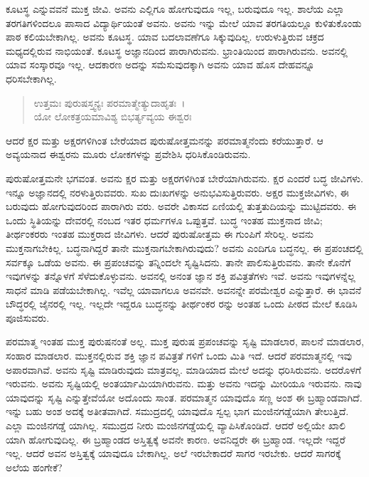 ಕೂಟಸ್ಥ ಎನ್ನುವವನೆ ಮುಕ್ತ ಜೀವಿ. ಅವನು ಎಲ್ಲಿಗೂ ಹೋಗುವುದೂ ಇಲ್ಲ, ಬರುವುದೂ ಇಲ್ಲ. ಶಾಲೆಯ ಎಲ್ಲಾ ತರಗತಿಗಳಿಂದಲೂ ಪಾಸಾದ ವಿದ್ಯಾರ್ಥಿಯಂತೆ ಅವನು. ಅವನು ಇನ್ನು ಮೇಲೆ ಯಾವ ತರಗತಿಯಲ್ಲೂ ಕುಳಿತುಕೊಂಡು ಪಾಠ ಕಲಿಯಬೇಕಾಗಿಲ್ಲ. ಅವನು ಕೂಟಸ್ಥ. ಯಾವ ಬದಲಾವಣೆಗೂ ಸಿಕ್ಕುವುದಿಲ್ಲ. ಉರುಳುತ್ತಿರುವ ಚಕ್ರದ ಮಧ್ಯದಲ್ಲಿರುವ ನಾಭಿಯಂತೆ. ಕೂಟಸ್ಥ ಅಜ್ಞಾನದಿಂದ ಪಾರಾಗಿರುವನು. ಭ್ರಾಂತಿಯಿಂದ ಪಾರಾಗಿರುವನು. ಅವನಲ್ಲಿ ಯಾವ ಸಂಸ್ಕಾರವೂ ಇಲ್ಲ. ಆದಕಾರಣ ಅದನ್ನು ಸಮೆಸುವುದಕ್ಕಾಗಿ ಅವನು ಯಾವ ಹೊಸ ದೇಹವನ್ನೂ ಧರಿಸಬೇಕಾಗಿಲ್ಲ.

\begin{verse}
ಉತ್ತಮಃ ಪುರುಷಸ್ತ್ವನ್ಯಃ ಪರಮಾತ್ಮೇತ್ಯುದಾಹೃತಃ~।\\ಯೋ ಲೋಕತ್ರಯಮಾವಿಶ್ಯ ಬಿಭರ್ತ್ಯವ್ಯಯ ಈಶ್ವರಃ 
\end{verse}

{\small ಆದರೆ ಕ್ಷರ ಮತ್ತು ಅಕ್ಷರಗಳಿಗಿಂತ ಬೇರೆಯಾದ ಪುರುಷೋತ್ತಮನನ್ನು ಪರಮಾತ್ಮನೆಂದು ಕರೆಯುತ್ತಾರೆ. ಆ ಅವ್ಯಯನಾದ ಈಶ್ವರನು ಮೂರು ಲೋಕಗಳನ್ನು ಪ್ರವೇಶಿಸಿ ಧರಿಸಿಕೊಂಡಿರುವನು.}

ಪುರುಷೋತ್ತಮನೇ ಭಗವಂತ. ಅವನು ಕ್ಷರ ಮತ್ತು ಅಕ್ಷರಗಳಿಗಿಂತ ಬೇರೆಯಾಗಿರುವನು. ಕ್ಷರ ಎಂದರೆ ಬದ್ಧ ಜೀವಿಗಳು. ಇನ್ನೂ ಅಜ್ಞಾನದಲ್ಲಿ ನರಳುತ್ತಿರುವವರು. ಸುಖ ದುಃಖಗಳನ್ನು ಅನುಭವಿಸುತ್ತಿರುವರು. ಅಕ್ಷರ ಮುಕ್ತಜೀವಿಗಳು, ಈ ಬರುವುದು ಹೋಗುವುದರಿಂದ ಪಾರಾಗಿರು ವರು. ಅವರೇ ವಿಕಾಸದ ಏಣಿಯಲ್ಲಿ ತುತ್ತತುದಿಯನ್ನು ಮುಟ್ಟಿದವರು. ಈ ಒಂದು ಸ್ಥಿತಿಯನ್ನು ದೇವರಲ್ಲಿ ನಂಬದ ಇತರ ಧರ್ಮಗಳೂ ಒಪ್ಪುತ್ತವೆ. ಬುದ್ಧ ಇಂತಹ ಮುಕ್ತನಾದ ಜೀವಿ; ತೀರ್ಥಂಕರರು ಇಂತಹ ಮುಕ್ತರಾದ ಜೀವಿಗಳು. ಆದರೆ ಪುರುಷೋತ್ತಮ ಈ ಗುಂಪಿಗೆ ಸೇರಿಲ್ಲ. ಅವನು ಮುಕ್ತನಾಗಬೇಕಿಲ್ಲ. ಬದ್ಧನಾಗಿದ್ದರೆ ತಾನೇ ಮುಕ್ತನಾಗಬೇಕಾಗಿರುವುದು? ಅವನು ಎಂದಿಗೂ ಬದ್ಧನಲ್ಲ. ಈ ಪ್ರಪಂಚದಲ್ಲಿ ಸರ್ವಕ್ಕೂ ಒಡೆಯ ಅವನು. ಈ ಪ್ರಪಂಚವನ್ನು ತನ್ನಿಂದಲೇ ಸೃಷ್ಟಿಸಿದನು. ತಾನೇ ಪಾಲಿಸುತ್ತಿರುವನು. ತಾನೇ ಕೊನೆಗೆ ಇವುಗಳನ್ನು ತನ್ನೊಳಗೆ ಸೆಳೆದುಕೊಳ್ಳುವನು. ಅವನಲ್ಲಿ ಅನಂತ ಜ್ಞಾನ ಶಕ್ತಿ ಪವಿತ್ರತೆಗಳು ಇವೆ. ಅವನು ಇವುಗಳನ್ನೆಲ್ಲ ಸಾಧನೆ ಮಾಡಿ ಪಡೆಯಬೇಕಾಗಿಲ್ಲ. ಇವೆಲ್ಲ ಯಾವಾಗಲೂ ಅವನವೇ. ಅವನನ್ನೇ ಪರಮೇಶ್ವರ ಎನ್ನುತ್ತಾರೆ. ಈ ಭಾವನೆ ಬೌದ್ಧರಲ್ಲಿ ಜೈನರಲ್ಲಿ ಇಲ್ಲ. ಇಲ್ಲದೇ ಇದ್ದರೂ ಬುದ್ಧನನ್ನು ತೀರ್ಥಂಕರ ರನ್ನು ಅಂತಹ ಒಂದು ಪೀಠದ ಮೇಲೆ ಕೂಡಿಸಿ ಪೂಜಿಸುವರು.

ಪರಮಾತ್ಮ ಇಂತಹ ಮುಕ್ತ ಪುರುಷನಂತೆ ಅಲ್ಲ. ಮುಕ್ತ ಪುರುಷ ಪ್ರಪಂಚವನ್ನು ಸೃಷ್ಟಿ ಮಾಡಲಾರ, ಪಾಲನೆ ಮಾಡಲಾರ, ಸಂಹಾರ ಮಾಡಲಾರ. ಮುಕ್ತನಲ್ಲಿರುವ ಶಕ್ತಿ ಜ್ಞಾನ ಪವಿತ್ರತೆ ಗಳಿಗೆ ಒಂದು ಮಿತಿ ಇದೆ. ಆದರೆ ಪರಮಾತ್ಮನಲ್ಲಿ ಇವು ಅಪಾರವಾಗಿವೆ. ಅವನು ಸೃಷ್ಟಿ ಮಾಡಿರುವುದು ಮಾತ್ರವಲ್ಲ. ಮಾಡಿಯಾದ ಮೇಲೆ ಅದನ್ನು ಧರಿಸಿರುವನು. ಅದರೊಳಗೆ ಇರುವನು. ಅವನು ಸೃಷ್ಟಿಯಲ್ಲಿ ಅಂತರ್ಯಾಮಿಯಾಗಿರುವನು. ಮತ್ತು ಅವನು ಇದನ್ನು ಮೀರಿಯೂ ಇರುವನು. ನಾವು ಯಾವುದನ್ನು ಸೃಷ್ಟಿ ಎನ್ನುತ್ತೇವೆಯೋ ಅದೊಂದು ಸಾಂತ. ಪರಮಾತ್ಮನ ಯಾವುದೊ ಸಣ್ಣ ಅಂಶ ಈ ಬ್ರಹ್ಮಾಂಡವಾಗಿದೆ. ಇನ್ನು ಬಹು ಅಂಶ ಅದಕ್ಕೆ ಅತೀತವಾಗಿದೆ. ಸಮುದ್ರದಲ್ಲಿ ಯಾವುದೊ ಸ್ವಲ್ಪ ಭಾಗ ಮಂಜಿನಗಡ್ಡೆಯಾಗಿ ತೇಲುತ್ತಿದೆ. ಎಲ್ಲಾ ಮಂಜಿನಗಡ್ಡೆ ಯಾಗಿಲ್ಲ. ಸಮುದ್ರದ ನೀರು ಮಂಜಿನಗಡ್ಡೆಯಲ್ಲಿ ವ್ಯಾಪಿಸಿಕೊಂಡಿದೆ. ಆದರೆ ಅಲ್ಲಿಯೇ ಖಾಲಿ ಯಾಗಿ ಹೋಗುವುದಿಲ್ಲ. ಈ ಬ್ರಹ್ಮಾಂಡದ ಅಸ್ತಿತ್ವಕ್ಕೆ ಅವನೇ ಕಾರಣ. ಅವನಿದ್ದರೇ ಈ ಬ್ರಹ್ಮಾಂಡ. ಇಲ್ಲದೇ ಇದ್ದರೆ ಇಲ್ಲ. ಆದರೆ ಅವನ ಅಸ್ತಿತ್ವಕ್ಕೆ ಯಾವುದೂ ಬೇಕಾಗಿಲ್ಲ. ಅಲೆ ಇರಬೇಕಾದರೆ ಸಾಗರ ಇರಬೇಕು. ಆದರೆ ಸಾಗರಕ್ಕೆ ಅಲೆಯ ಹಂಗೇಕೆ?

